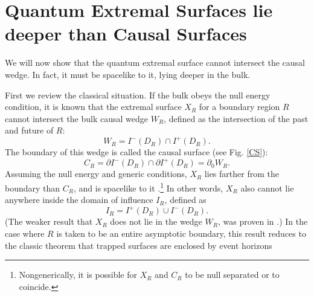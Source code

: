 \documentclass[12pt]{article}
\theoremstyle{remark}
\newcommand{\netta}[1]{{\color{red}#1}}
\newcommand{\aw}[1]{{\color{blue}#1}}
\numberwithin{equation}{section}
\numberwithin{equation}{section}
\begin{document}

\section{Quantum Extremal Surfaces lie deeper than Causal Surfaces}\label{reach}

We will now show that the quantum extremal surface cannot intersect the causal wedge.  In fact, it must be spacelike to it, lying deeper in the bulk.

First we review the classical situation.  If the bulk obeys the null energy condition, it is known that the extremal surface $X_R$ for a boundary region $R$ cannot intersect the bulk causal wedge $W_R$, defined as the intersection of the past and future of $R$:
\begin{equation} 
W_R = I^{-}\left (D_{R}\right) \cap I^{+}\left(D_{R}\right). 
\end{equation}
The boundary of this wedge is called the causal surface (see Fig. \ref{CS}):
\begin{equation} 
C_R = \partial I^{-} \left(D_{R} \right) \cap \partial I^{+}\left(D_{R}\right) = \partial_0 W_R.
\end{equation}
Assuming the null energy and generic conditions, $X_R$ lies farther from the boundary than $C_R$, and is spacelike to it \cite{Wall12}.\footnote{Nongenerically, it is possible for $X_R$ and $C_R$ to be null separated or to coincide.}  
In other words, $X_R$ also cannot lie anywhere inside the domain of influence $I_R$, defined as
\begin{equation}
I_R = I^+(D_R) \cup I^-(D_R).
\end{equation}
(The weaker result that $X_R$ does not lie in the wedge $W_R$, was proven in \cite{HubenyRangamani}.)  In the case where $R$ is taken to be an entire asymptotic boundary, this result reduces to the classic theorem that trapped surfaces are enclosed by event horizons \cite{HawkingEllis,Wald}
\end{document}
